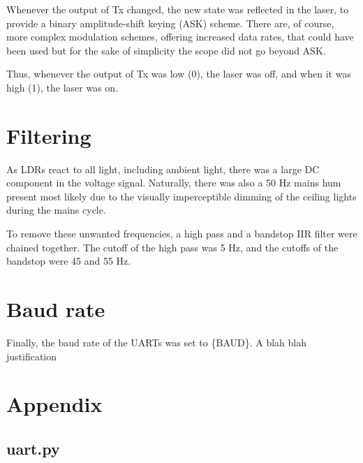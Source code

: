 \documentclass{article}
\begin{document}
\begin{multicols}{2}
Whenever the output of Tx changed, the new state was reflected in the laser, to provide a binary amplitude-shift keying (ASK) scheme. There are, of course, more complex modulation schemes, offering increased data rates, that could have been used but for the sake of simplicity the scope did not go beyond ASK. 

Thus, whenever the output of Tx was low (0), the laser was off, and when it was high (1), the laser was on.

\section{Filtering}
As LDRs react to all light, including ambient light, there was a large DC component in the voltage signal. Naturally, there was also a 50 Hz mains hum present most likely due to the visually imperceptible dimming of the ceiling lights during the mains cycle.

To remove these unwanted frequencies, a high pass and a bandstop IIR filter were chained together. The cutoff of the high pass was 5 Hz, and the cutoffs of the bandstop were 45 and 55 Hz.

\section{Baud rate}
Finally, the baud rate of the UARTs was set to \{BAUD\}. A blah blah justification

\end{multicols}

\section{Appendix}

\subsection{uart.py}

\end{document}
